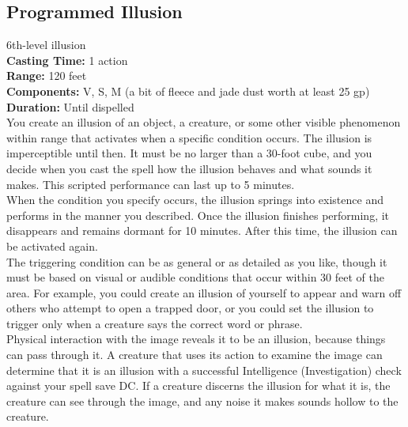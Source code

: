 \documentclass[11pt, A4paper, english]{article}
\begin{document}
		\subsection{Programmed Illusion}
6th-level illusion \\
\textbf{Casting Time:} 1 action \\
\textbf{Range:} 120 feet \\
\textbf{Components:} V, S, M (a bit of fleece and jade dust worth at least 25 gp) \\
\textbf{Duration:} Until dispelled \\
You create an illusion of an object, a creature, or some other visible phenomenon within range that activates when a specific condition occurs. The illusion is imperceptible until then. It must be no larger than a 30-foot cube, and you decide when you cast the spell how the illusion behaves and what sounds it makes. This scripted performance can last up to 5 minutes. \\
When the condition you specify occurs, the illusion springs into existence and performs in the manner you described. Once the illusion finishes performing, it disappears and remains dormant for 10 minutes. After this time, the illusion can be activated again. \\
The triggering condition can be as general or as detailed as you like, though it must be based on visual or audible conditions that occur within 30 feet of the area. For example, you could create an illusion of yourself to appear and warn off others who attempt to open a trapped door, or you could set the illusion to trigger only when a creature says the correct word or phrase. \\
Physical interaction with the image reveals it to be an illusion, because things can pass through it. A creature that uses its action to examine the image can determine that it is an illusion with a successful Intelligence (Investigation) check against your spell save DC. If a creature discerns the illusion for what it is, the creature can see through the image, and any noise it makes sounds hollow to the creature.
\end{document}
